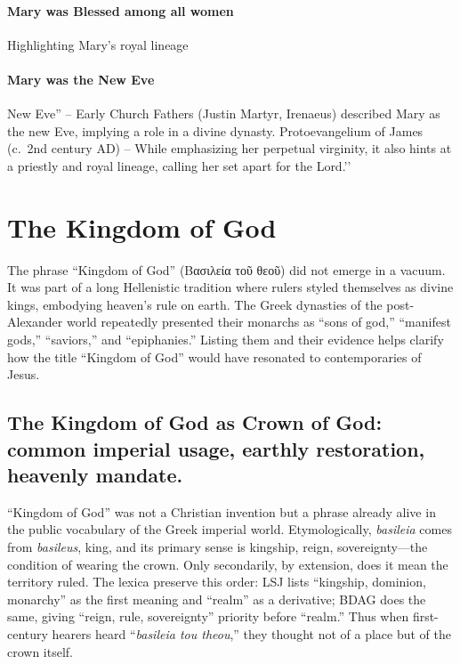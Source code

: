 \paragraph{Mary was Blessed among all women}\label{par:mary-was-blessed-among-all-women}
Highlighting Mary’s royal lineage
\paragraph{Mary was the New Eve}\label{par:mary-was-the-new-eve}
New Eve'' -- Early Church Fathers (Justin Martyr, Irenaeus) described Mary as the new Eve, implying a role in a divine dynasty.
Protoevangelium of James (c.~2nd century AD) -- While emphasizing her perpetual virginity, it also hints at a priestly and royal lineage, calling her set apart for the Lord.’’

\section{The Kingdom of God}\label{sec:the-kingdom-of-god}
The phrase “Kingdom of God” (\textgreek{Βασιλεία τοῦ θεοῦ}) did not emerge in a vacuum.
It was part of a long Hellenistic tradition where rulers styled themselves as divine kings, embodying heaven’s rule on earth.
The Greek dynasties of the post-Alexander world repeatedly presented their monarchs as “sons of god,” “manifest gods,” “saviors,” and “epiphanies.”
Listing them and their evidence helps clarify how the title “Kingdom of God” would have resonated to contemporaries of Jesus.

\subsection{The Kingdom of God as Crown of God: common imperial usage, earthly restoration, heavenly mandate.}\label{subsec:the-kingdom-of-god-as-crown-of-god-common-imperial-usage-earthly-restoration-heavenly-mandate}
“Kingdom of God” was not a Christian invention but a phrase already alive in the public vocabulary of the Greek imperial world.
Etymologically, \emph{basileia} comes from \emph{basileus}, king, and its primary sense is kingship, reign, sovereignty—the condition of wearing the crown.
Only secondarily, by extension, does it mean the territory ruled.
The lexica preserve this order: LSJ lists “kingship, dominion, monarchy” as the first meaning and “realm” as a derivative; BDAG does the same, giving “reign, rule, sovereignty” priority before “realm.”
Thus when first-century hearers heard “\emph{basileia tou theou},” they thought not of a place but of the crown itself.

